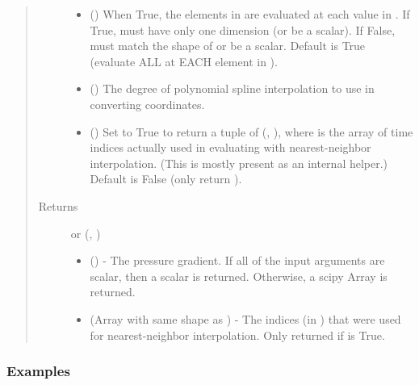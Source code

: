 \documentclass[letterpaper,10pt,english]{sphinxmanual}
\begin{document}
\begin{fulllineitems}
\begin{fulllineitems}
\begin{quote}
\begin{description}
\begin{itemize}
\item {} 
 () \textendash{} When True, the elements in  are evaluated
at each value in . If True,  must have only one dimension
(or be a scalar). If False,  must match the shape of 
or be a scalar. Default is True (evaluate ALL  at EACH
element in ).

\item {} 
 () \textendash{} The degree of polynomial spline interpolation to
use in converting coordinates.

\item {} 
 () \textendash{} Set to True to return a tuple of (,
), where  is the array of time indices
actually used in evaluating  with nearest-neighbor
interpolation. (This is mostly present as an internal helper.)
Default is False (only return ).

\end{itemize}

\item[{Returns}] \leavevmode

 or (, )
\begin{itemize}
\item {} 
 () - The pressure gradient. If
all of the input arguments are scalar, then a scalar is returned.
Otherwise, a scipy Array is returned.

\item {} 
 (Array with same shape as ) - The indices
(in ) that were used for
nearest-neighbor interpolation. Only returned if  is
True.

\end{itemize}


\end{description}\end{quote}
\subsubsection*{Examples}


\end{fulllineitems}
\end{fulllineitems}
\end{document}
